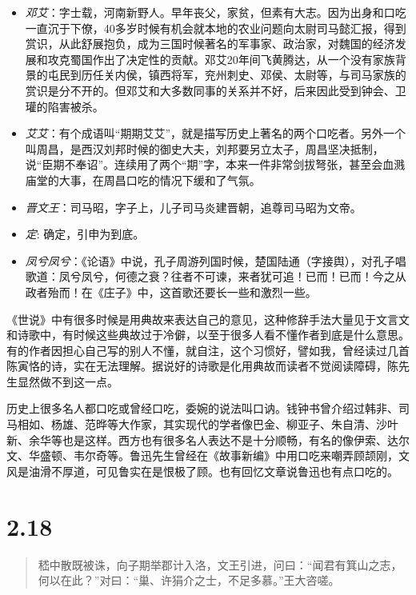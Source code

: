 \documentclass[]{book}
\providecommand{\tightlist}{%
  \setlength{\itemsep}{0pt}\setlength{\parskip}{0pt}}
\begin{document}
\begin{itemize}
\tightlist
\item
  \emph{邓艾}：字士载，河南新野人。早年丧父，家贫，但素有大志。因为出身和口吃一直沉于下僚，40多岁时候有机会就本地的农业问题向太尉司马懿汇报，得到赏识，从此舒展抱负，成为三国时候著名的军事家、政治家，对魏国的经济发展和攻克蜀国作出了决定性的贡献。邓艾20年间飞黄腾达，从一个没有家族背景的屯民到历任关内侯，镇西将军，兖州刺史、邓侯、太尉等，与司马家族的赏识是分不开的。但邓艾和大多数同事的关系并不好，后来因此受到钟会、卫瓘的陷害被杀。
\item
  \emph{艾艾}：有个成语叫``期期艾艾''，就是描写历史上著名的两个口吃者。另外一个叫周昌，是西汉刘邦时候的御史大夫，刘邦要另立太子，周昌坚决抵制，说``臣期不奉诏''。连续用了两个``期''字，本来一件非常剑拔弩张，甚至会血溅庙堂的大事，在周昌口吃的情况下缓和了气氛。
\item
  \emph{晋文王}：司马昭，字子上，儿子司马炎建晋朝，追尊司马昭为文帝。
\item
  \emph{定}: 确定，引申为到底。
\item
  \emph{凤兮凤兮}：《论语》中说，孔子周游列国时候，楚国陆通（字接舆），对孔子唱歌道：凤兮凤兮，何德之衰？往者不可谏，来者犹可追！已而！已而！今之从政者殆而！在《庄子》中，这首歌还要长一些和激烈一些。
\end{itemize}

《世说》中有很多时候是用典故来表达自己的意见，这种修辞手法大量见于文言文和诗歌中，有时候这些典故过于冷僻，以至于很多人看不懂作者到底是什么意思。有的作者因担心自己写的别人不懂，就自注，这个习惯好，譬如我，曾经读过几首陈寅恪的诗，实在无法理解。据说好的诗歌是化用典故而读者不觉阅读障碍，陈先生显然做不到这一点。

历史上很多名人都口吃或曾经口吃，委婉的说法叫口讷。钱钟书曾介绍过韩非、司马相如、杨雄、范晔等大作家，其实现代的学者像巴金、柳亚子、朱自清、沙叶新、余华等也是这样。西方也有很多名人表达不是十分顺畅，有名的像伊索、达尔文、华盛顿、韦尔奇等。鲁迅先生曾经在《故事新编》中用口吃来嘲弄顾颉刚，文风是油滑不厚道，可见鲁实在是恨极了顾。也有回忆文章说鲁迅也有点口吃的。　　

\section{2.18}\label{section-64}

\begin{quote}
嵇中散既被诛，向子期举郡计入洛，文王引进，问曰：``闻君有箕山之志，何以在此？''对曰：``巢、许狷介之士，不足多慕。''王大咨嗟。
\end{quote}
\end{document}
